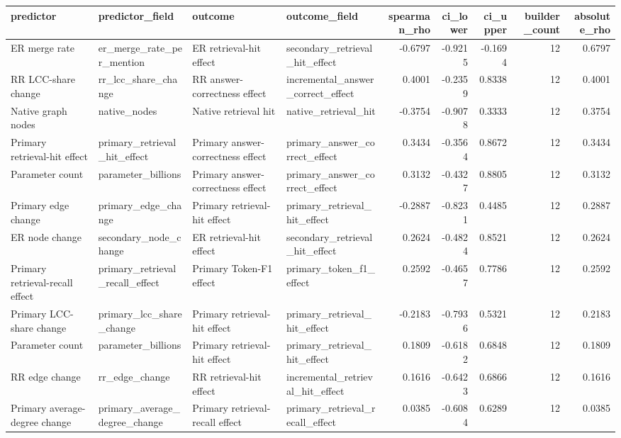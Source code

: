 \begin{tabular}{llllrrrrr}
\toprule
predictor & predictor_field & outcome & outcome_field & spearman_rho & ci_lower & ci_upper & builder_count & absolute_rho \\
\midrule
ER merge rate & er_merge_rate_per_mention & ER retrieval-hit effect & secondary_retrieval_hit_effect & -0.6797 & -0.9215 & -0.1694 & 12 & 0.6797 \\
RR LCC-share change & rr_lcc_share_change & RR answer-correctness effect & incremental_answer_correct_effect & 0.4001 & -0.2359 & 0.8338 & 12 & 0.4001 \\
Native graph nodes & native_nodes & Native retrieval hit & native_retrieval_hit & -0.3754 & -0.9078 & 0.3333 & 12 & 0.3754 \\
Primary retrieval-hit effect & primary_retrieval_hit_effect & Primary answer-correctness effect & primary_answer_correct_effect & 0.3434 & -0.3564 & 0.8672 & 12 & 0.3434 \\
Parameter count & parameter_billions & Primary answer-correctness effect & primary_answer_correct_effect & 0.3132 & -0.4327 & 0.8805 & 12 & 0.3132 \\
Primary edge change & primary_edge_change & Primary retrieval-hit effect & primary_retrieval_hit_effect & -0.2887 & -0.8231 & 0.4485 & 12 & 0.2887 \\
ER node change & secondary_node_change & ER retrieval-hit effect & secondary_retrieval_hit_effect & 0.2624 & -0.4824 & 0.8521 & 12 & 0.2624 \\
Primary retrieval-recall effect & primary_retrieval_recall_effect & Primary Token-F1 effect & primary_token_f1_effect & 0.2592 & -0.4657 & 0.7786 & 12 & 0.2592 \\
Primary LCC-share change & primary_lcc_share_change & Primary retrieval-hit effect & primary_retrieval_hit_effect & -0.2183 & -0.7936 & 0.5321 & 12 & 0.2183 \\
Parameter count & parameter_billions & Primary retrieval-hit effect & primary_retrieval_hit_effect & 0.1809 & -0.6182 & 0.6848 & 12 & 0.1809 \\
RR edge change & rr_edge_change & RR retrieval-hit effect & incremental_retrieval_hit_effect & 0.1616 & -0.6423 & 0.6866 & 12 & 0.1616 \\
Primary average-degree change & primary_average_degree_change & Primary retrieval-recall effect & primary_retrieval_recall_effect & 0.0385 & -0.6084 & 0.6289 & 12 & 0.0385 \\
\bottomrule
\end{tabular}
